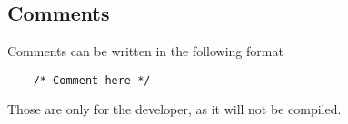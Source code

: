 \subsection{Comments}

Comments can be written in the following format

\begin{lstlisting}
    /* Comment here */
\end{lstlisting}

Those are only for the developer, as it will not be compiled.
